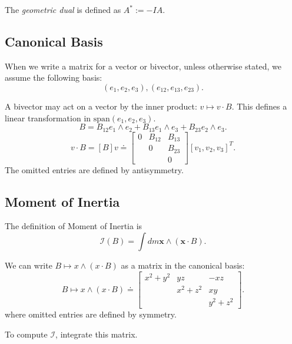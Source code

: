 The \textit{geometric dual} is defined as $A^* := -IA$. 


\subsection{Canonical Basis}

When we write a matrix for a vector or bivector, unless otherwise stated, we assume the following basis:
\[
	(e_1, e_2, e_3), (e_{12}, e_{13}, e_{23})
.\] 

A bivector may act on a vector by the inner product: $v \mapsto v \cdot B$. This defines a linear transformation in  $\text{span}\left( e_1, e_2, e_3 \right) $. 
\[
	B = B_{12} e_1 \wedge e_2 + B_{13} e_1 \wedge e_3 + B_{23} e_2 \wedge e_3
.\] 
\[
	 v \cdot B = [B] v \doteq 
	\begin{bmatrix}
0 & B_{12} & B_{13}\\
 & 0 & B_{23}\\
 & & 0
\end{bmatrix}
[v_1, v_2, v_3]^T
.\] 
The omitted entries are defined by antisymmetry.

\subsection{Moment of Inertia}

The definition of Moment of Inertia is
\[
	\mathcal{I}(B) = \int dm \mathbf{x} \wedge \left( \mathbf{x} \cdot B \right) 
.\] 

We can write $B \mapsto x \wedge (x \cdot B)$ as a matrix in the canonical basis:
\[
	B \mapsto x \wedge (x \cdot B) \doteq
\begin{bmatrix}
x^2 + y^2 & yz & -xz\\
 & x^2 + z^2 & xy\\
 & & y^2 + z^2
\end{bmatrix}
.\] 
where omitted entries are defined by symmetry.

To compute $\mathcal{I}$, integrate this matrix.

